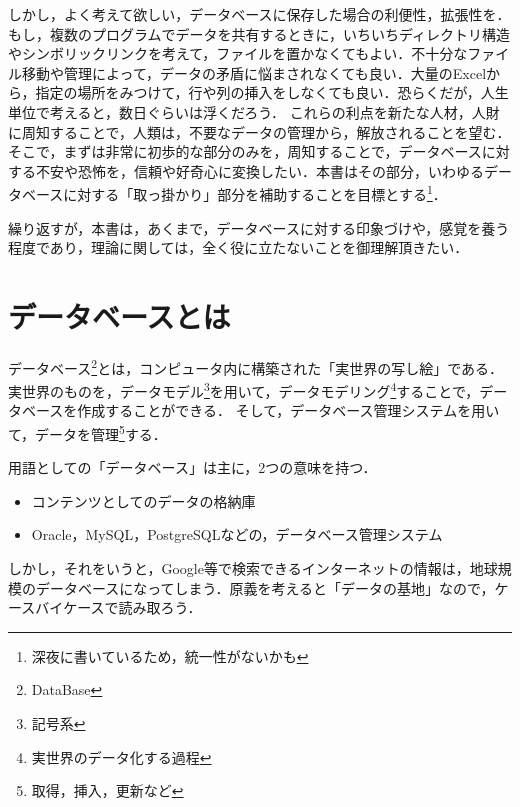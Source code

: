 \documentclass[a4paper,10pt]{jreport}
\begin{document}
\par しかし，よく考えて欲しい，データベースに保存した場合の利便性，拡張性を．もし，複数のプログラムでデータを共有するときに，いちいちディレクトリ構造やシンボリックリンクを考えて，ファイルを置かなくてもよい．不十分なファイル移動や管理によって，データの矛盾に悩まされなくても良い．大量のExcelから，指定の場所をみつけて，行や列の挿入をしなくても良い．恐らくだが，人生単位で考えると，数日ぐらいは浮くだろう．
これらの利点を新たな人材，人財に周知することで，人類は，不要なデータの管理から，解放されることを望む．そこで，まずは非常に初歩的な部分のみを，周知することで，データベースに対する不安や恐怖を，信頼や好奇心に変換したい．本書はその部分，いわゆるデータベースに対する「取っ掛かり」部分を補助することを目標とする\footnote{深夜に書いているため，統一性がないかも}．
\par 繰り返すが，本書は，あくまで，データベースに対する印象づけや，感覚を養う程度であり，理論に関しては，全く役に立たないことを御理解頂きたい．

\chapter{データベースとは}
\label{cha:データベースとは}
データベース\footnote{DataBase}とは，コンピュータ内に構築された「実世界の写し絵」である．実世界のものを，データモデル\footnote{記号系}を用いて，データモデリング\footnote{実世界のデータ化する過程}することで，データベースを作成することができる．
そして，データベース管理システムを用いて，データを管理\footnote{取得，挿入，更新など}する．
\par 用語としての「データベース」は主に，2つの意味を持つ．
\begin{itemize}
	\item コンテンツとしてのデータの格納庫
	\item Oracle，MySQL，PostgreSQLなどの，データベース管理システム
\end{itemize}
\par しかし，それをいうと，Google等で検索できるインターネットの情報は，地球規模のデータベースになってしまう．原義を考えると「データの基地」なので，ケースバイケースで読み取ろう．
\end{document}
